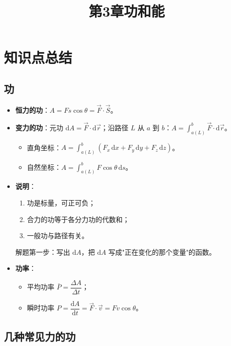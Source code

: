 \documentclass[12pt,a4paper]{ctexart}
\title{第3章\quad 功和能}
\author{}
\date{}
\begin{document}
\maketitle

\section{知识点总结}

\subsection{功}

\begin{itemize}
    \item \textbf{恒力的功}：$A = Fs\cos\theta = \vec{F}\cdot\vec{S}$。
    \item \textbf{变力的功}：元功 $\mathrm{d}A = \vec{F}\cdot\mathrm{d}\vec{r}$；沿路径 $L$ 从 $a$ 到 $b$：$A = \displaystyle\int_{a(L)}^b \vec{F}\cdot\mathrm{d}\vec{r}$。
    \begin{itemize}
        \item 直角坐标：$A = \displaystyle\int_{a(L)}^b (F_x\,\mathrm{d}x + F_y\,\mathrm{d}y + F_z\,\mathrm{d}z)$。
        \item 自然坐标：$A = \displaystyle\int_{a(L)}^b F\cos\theta\,\mathrm{d}s$。
    \end{itemize}
    \item \textbf{说明}：
    \begin{enumerate}
        \item 功是标量，可正可负；
        \item 合力的功等于各分力功的代数和；
        \item 一般功与路径有关。
    \end{enumerate}
    解题第一步：写出 $\mathrm{d}A$，把 $\mathrm{d}A$ 写成"正在变化的那个变量"的函数。
    \item \textbf{功率}：
    \begin{itemize}
        \item 平均功率 $\bar P = \dfrac{\Delta A}{\Delta t}$；
        \item 瞬时功率 $P = \dfrac{\mathrm{d}A}{\mathrm{d}t} = \vec{F}\cdot\vec{v} = Fv\cos\theta$。
    \end{itemize}
\end{itemize}

\subsection{几种常见力的功}
\end{document}
